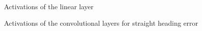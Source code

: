 \documentclass[a4paper,12pt,sort&compress]{article}
\begin{document}
\begin{figure}
    \centering
    \caption{Activations of the linear layer}
    \label{fig:activations}
\end{figure}

\begin{figure}
    \centering
    \caption{Activations of the convolutional layers for straight heading error}
    \label{fig:conv_activations}
\end{figure}
\end{document}
